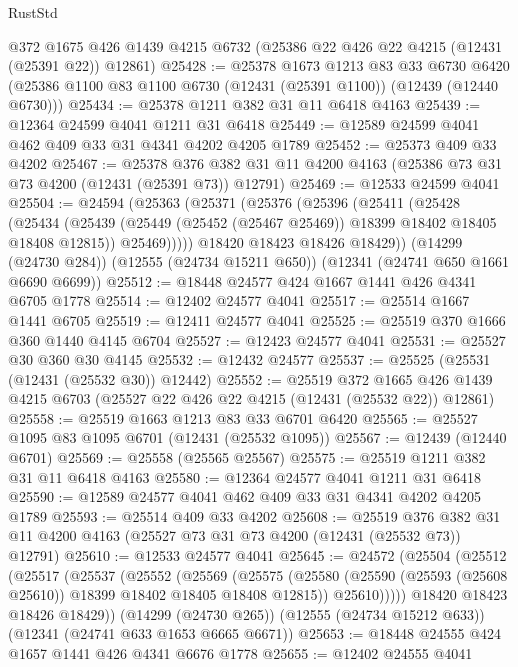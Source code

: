 \begin{lexlean}{RustStd}
\begin{coremodule}
    @372
    @1675
    @426
    @1439
    @4215
    @6732
    (@25386 @22 @426 @22 @4215 (@12431 (@25391 @22)) @12861)
@25428 := @25378
    @1673
    @1213
    @83
    @33
    @6730
    @6420
    (@25386 @1100 @83 @1100 @6730 (@12431 (@25391 @1100)) (@12439 (@12440 @6730)))
@25434 := @25378 @1211 @382 @31 @11 @6418 @4163
@25439 := @12364 @24599 @4041 @1211 @31 @6418
@25449 := @12589 @24599 @4041 @462 @409 @33 @31 @4341 @4202 @4205 @1789
@25452 := @25373 @409 @33 @4202
@25467 := @25378
    @376
    @382
    @31
    @11
    @4200
    @4163
    (@25386 @73 @31 @73 @4200 (@12431 (@25391 @73)) @12791)
@25469 := @12533 @24599 @4041
@25504 := @24594
    (@25363
      (@25371
        (@25376
          (@25396
            (@25411
              (@25428
                (@25434
                  (@25439 (@25449 (@25452 (@25467 @25469)) @18399 @18402 @18405 @18408 @12815))
                  @25469)))))
        @18420
        @18423
        @18426
        @18429))
    (@14299 (@24730 @284))
    (@12555 (@24734 @15211 @650))
    (@12341 (@24741 @650 @1661 @6690 @6699))
@25512 := @18448 @24577 @424 @1667 @1441 @426 @4341 @6705 @1778
@25514 := @12402 @24577 @4041
@25517 := @25514 @1667 @1441 @6705
@25519 := @12411 @24577 @4041
@25525 := @25519 @370 @1666 @360 @1440 @4145 @6704
@25527 := @12423 @24577 @4041
@25531 := @25527 @30 @360 @30 @4145
@25532 := @12432 @24577
@25537 := @25525 (@25531 (@12431 (@25532 @30)) @12442)
@25552 := @25519
    @372
    @1665
    @426
    @1439
    @4215
    @6703
    (@25527 @22 @426 @22 @4215 (@12431 (@25532 @22)) @12861)
@25558 := @25519 @1663 @1213 @83 @33 @6701 @6420
@25565 := @25527 @1095 @83 @1095 @6701 (@12431 (@25532 @1095))
@25567 := @12439 (@12440 @6701)
@25569 := @25558 (@25565 @25567)
@25575 := @25519 @1211 @382 @31 @11 @6418 @4163
@25580 := @12364 @24577 @4041 @1211 @31 @6418
@25590 := @12589 @24577 @4041 @462 @409 @33 @31 @4341 @4202 @4205 @1789
@25593 := @25514 @409 @33 @4202
@25608 := @25519
    @376
    @382
    @31
    @11
    @4200
    @4163
    (@25527 @73 @31 @73 @4200 (@12431 (@25532 @73)) @12791)
@25610 := @12533 @24577 @4041
@25645 := @24572
    (@25504
      (@25512
        (@25517
          (@25537
            (@25552
              (@25569
                (@25575
                  (@25580 (@25590 (@25593 (@25608 @25610)) @18399 @18402 @18405 @18408 @12815))
                  @25610)))))
        @18420
        @18423
        @18426
        @18429))
    (@14299 (@24730 @265))
    (@12555 (@24734 @15212 @633))
    (@12341 (@24741 @633 @1653 @6665 @6671))
@25653 := @18448 @24555 @424 @1657 @1441 @426 @4341 @6676 @1778
@25655 := @12402 @24555 @4041

\end{coremodule}
\end{lexlean}
